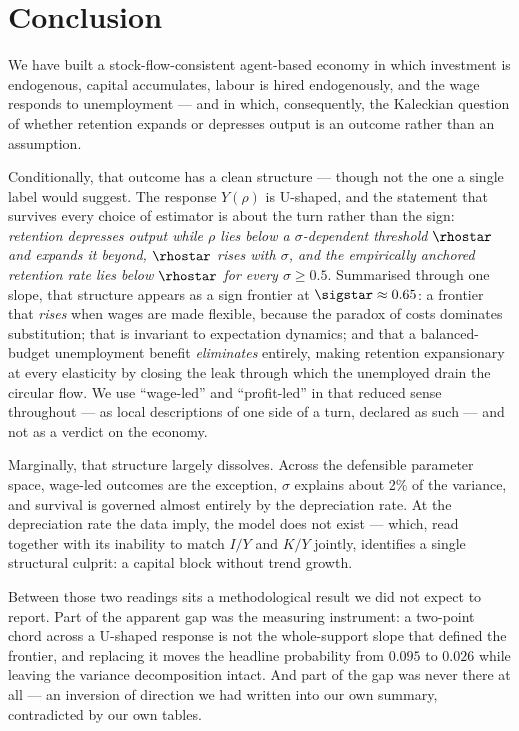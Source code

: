 
\section{Conclusion}
\label{sec:conclusion}

We have built a stock-flow-consistent agent-based economy in which investment
is endogenous, capital accumulates, labour is hired endogenously, and the wage
responds to unemployment --- and in which, consequently, the Kaleckian question
of whether retention expands or depresses output is an outcome rather than an
assumption.

Conditionally, that outcome has a clean structure --- though not the one a
single label would suggest. The response $Y(\rho)$ is U-shaped, and the
statement that survives every choice of estimator is about the turn rather
than the sign: \emph{retention depresses output while $\rho$ lies below a
$\sigma$-dependent threshold $\rhostar$ and expands it beyond, $\rhostar$
rises with $\sigma$, and the empirically anchored retention rate lies below
$\rhostar$ for every $\sigma \geq 0.5$}. Summarised through one slope, that
structure appears as a sign frontier at $\sigstar \approx 0.65$: a frontier
that \emph{rises} when wages are made flexible, because the paradox of costs
dominates substitution; that is invariant to expectation dynamics; and that a
balanced-budget unemployment benefit \emph{eliminates} entirely, making
retention expansionary at every elasticity by closing the leak through which
the unemployed drain the circular flow. We use ``wage-led'' and ``profit-led''
in that reduced sense throughout --- as local descriptions of one side of a
turn, declared as such --- and not as a verdict on the economy.

Marginally, that structure largely dissolves. Across the defensible parameter
space, wage-led outcomes are the exception, $\sigma$ explains about 2\% of the
variance, and survival is governed almost entirely by the depreciation rate. At
the depreciation rate the data imply, the model does not exist --- which, read
together with its inability to match $I/Y$ and $K/Y$ jointly, identifies a
single structural culprit: a capital block without trend growth.

Between those two readings sits a methodological result we did not expect to
report. Part of the apparent gap was the measuring instrument: a two-point
chord across a U-shaped response is not the whole-support slope that defined
the frontier, and replacing it moves the headline probability from $0.095$ to
$0.026$ while leaving the variance decomposition intact. And part of the gap
was never there at all --- an inversion of direction we had written into our
own summary, contradicted by our own tables.

